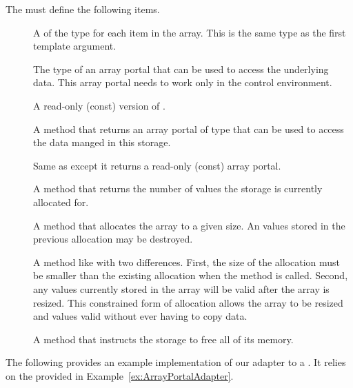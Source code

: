 
The  must define the following items.
\begin{description}
\item[] A  of the type for each item
  in the array. This is the same type as the first template argument.
\item[] The type of an array portal that can be used
  to access the underlying data. This array portal needs to work only in
  the control environment.
\item[] A read-only (const) version of
  .
\item[] A method that returns an array portal of type
   that can be used to access the data manged in this
  storage.
\item[] Same as  except it
  returns a read-only (const) array portal.
\item[] A method that returns the number of
  values the storage is currently allocated for.
\item[] A method that allocates the array to a given
  size. An values stored in the previous allocation may be destroyed.
\item[] A method like  with two
  differences. First, the size of the allocation must be smaller than the
  existing allocation when the method is called. Second, any values
  currently stored in the array will be valid after the array is
  resized. This constrained form of allocation allows the array to be
  resized and values valid without ever having to copy data.
\item[] A method that instructs the storage to
  free all of its memory.
\end{description}

The following provides an example implementation of our adapter to a
. It relies on the
 provided in
Example~\ref{ex:ArrayPortalAdapter}.




